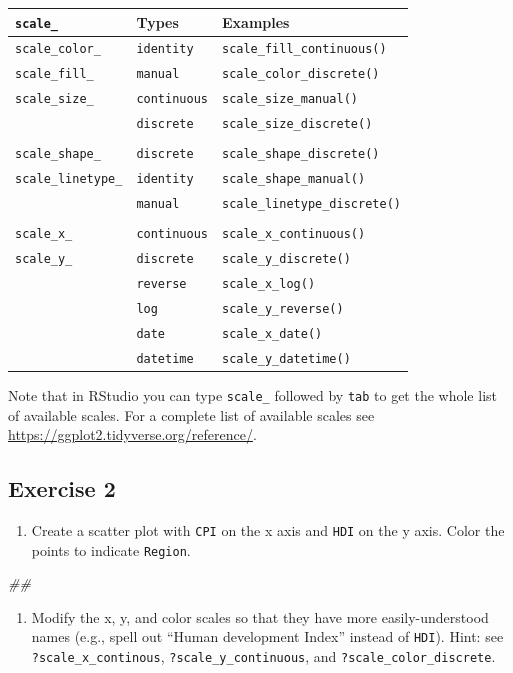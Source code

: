 \documentclass[
]{book}
\newenvironment{Shaded}{\begin{snugshade}}{\end{snugshade}}
\newcommand{\CommentTok}[1]{\textcolor[rgb]{0.56,0.35,0.01}{\textit{#1}}}
\providecommand{\tightlist}{%
  \setlength{\itemsep}{0pt}\setlength{\parskip}{0pt}}
\begin{document}
\begin{longtable}[]{@{}lll@{}}
\toprule
\texttt{scale\_} & Types & Examples\tabularnewline
\midrule
\endhead
\texttt{scale\_color\_} & \texttt{identity} & \texttt{scale\_fill\_continuous()}\tabularnewline
\texttt{scale\_fill\_} & \texttt{manual} & \texttt{scale\_color\_discrete()}\tabularnewline
\texttt{scale\_size\_} & \texttt{continuous} & \texttt{scale\_size\_manual()}\tabularnewline
& \texttt{discrete} & \texttt{scale\_size\_discrete()}\tabularnewline
& &\tabularnewline
\texttt{scale\_shape\_} & \texttt{discrete} & \texttt{scale\_shape\_discrete()}\tabularnewline
\texttt{scale\_linetype\_} & \texttt{identity} & \texttt{scale\_shape\_manual()}\tabularnewline
& \texttt{manual} & \texttt{scale\_linetype\_discrete()}\tabularnewline
& &\tabularnewline
\texttt{scale\_x\_} & \texttt{continuous} & \texttt{scale\_x\_continuous()}\tabularnewline
\texttt{scale\_y\_} & \texttt{discrete} & \texttt{scale\_y\_discrete()}\tabularnewline
& \texttt{reverse} & \texttt{scale\_x\_log()}\tabularnewline
& \texttt{log} & \texttt{scale\_y\_reverse()}\tabularnewline
& \texttt{date} & \texttt{scale\_x\_date()}\tabularnewline
& \texttt{datetime} & \texttt{scale\_y\_datetime()}\tabularnewline
\bottomrule
\end{longtable}

Note that in RStudio you can type \texttt{scale\_} followed by \texttt{tab} to get the whole list of available scales. For a complete list of available scales see \url{https://ggplot2.tidyverse.org/reference/}.

\hypertarget{exercise-2-1}{%
\subsection{Exercise 2}\label{exercise-2-1}}

\begin{enumerate}
\def\labelenumi{\arabic{enumi}.}
\tightlist
\item
  Create a scatter plot with \texttt{CPI} on the x axis and \texttt{HDI} on the y axis. Color the points to indicate \texttt{Region}.
\end{enumerate}

\begin{Shaded}
\begin{Highlighting}[]
\CommentTok{\#\# }
\end{Highlighting}
\end{Shaded}

\begin{enumerate}
\def\labelenumi{\arabic{enumi}.}
\setcounter{enumi}{1}
\tightlist
\item
  Modify the x, y, and color scales so that they have more easily-understood names (e.g., spell out ``Human development Index'' instead of \texttt{HDI}). Hint: see \texttt{?scale\_x\_continous}, \texttt{?scale\_y\_continuous}, and \texttt{?scale\_color\_discrete}.
\end{enumerate}
\end{document}
